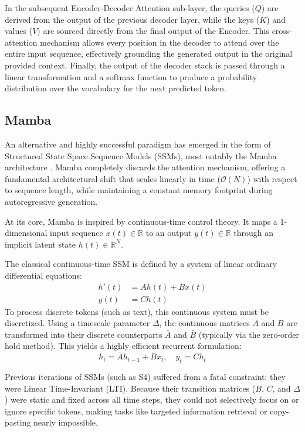 \documentclass[en,ack]{dimscthesis}
\begin{document}
In the subsequent Encoder-Decoder Attention sub-layer, the queries ($Q$) are derived from the output of the previous decoder layer, while the keys ($K$) and values ($V$) are sourced directly from the final output of the Encoder. This cross-attention mechanism allows every position in the decoder to attend over the entire input sequence, effectively grounding the generated output in the original provided context. Finally, the output of the decoder stack is passed through a linear transformation and a softmax function to produce a probability distribution over the vocabulary for the next predicted token.

\subsection{Mamba}
An alternative and highly successful paradigm has emerged in the form of Structured State Space Sequence Models (SSMs), most notably the Mamba architecture \parencite{guMambaLinearTimeSequence2024}. Mamba completely discards the attention mechanism, offering a fundamental architectural shift that scales linearly in time ($\mathcal{O}(N)$) with respect to sequence length, while maintaining a constant memory footprint during autoregressive generation.

At its core, Mamba is inspired by continuous-time control theory. It maps a 1-dimensional input sequence $x(t) \in \mathbb{R}$ to an output $y(t) \in \mathbb{R}$ through an implicit latent state $h(t) \in \mathbb{R}^N$.

The classical continuous-time SSM is defined by a system of linear ordinary differential equations:
\begin{align}
	h'(t) &= A h(t) + B x(t) \\
	y(t) &= C h(t)
\end{align}
To process discrete tokens (such as text), this continuous system must be discretized. Using a timescale parameter $\Delta$, the continuous matrices $A$ and $B$ are transformed into their discrete counterparts $\bar{A}$ and $\bar{B}$ (typically via the zero-order hold method). This yields a highly efficient recurrent formulation:
\begin{equation}
	h_t = \bar{A} h_{t-1} + \bar{B} x_t, \quad y_t = C h_t
\end{equation}

\par Previous iterations of SSMs (such as S4) suffered from a fatal constraint: they were Linear Time-Invariant (LTI). Because their transition matrices ($B$, $C$, and $\Delta$) were static and fixed across all time steps, they could not selectively focus on or ignore specific tokens, making tasks like targeted information retrieval or copy-pasting nearly impossible. 
\end{document}
